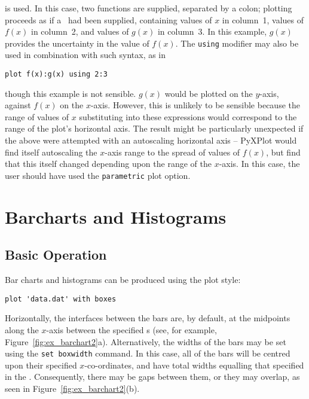 \noindent is used. In this case, two functions are supplied, separated by a
colon; plotting proceeds as if a \datafile\ had been supplied, containing
values of $x$ in column~1, values of $f(x)$ in column~2, and values of $g(x)$
in column~3. In this example, $g(x)$ provides the uncertainty in the value of
$f(x)$.  The {\tt using} modifier may also be used in combination with such
syntax, as in

\begin{verbatim}
plot f(x):g(x) using 2:3
\end{verbatim}

\noindent though this example is not sensible. $g(x)$ would be plotted on the
$y$-axis, against $f(x)$ on the $x$-axis. However, this is unlikely to be
sensible because the range of values of $x$ substituting into these expressions
would correspond to the range of the plot's horizontal axis. The result might
be particularly unexpected if the above were attempted with an autoscaling
horizontal axis -- PyXPlot would find itself autoscaling the $x$-axis range to
the spread of values of $f(x)$, but find that this itself changed depending
upon the range of the $x$-axis. In this case, the user should have used the
{\tt parametric} plot option.

\section{Barcharts and Histograms}
\label{sec:barcharts}

\subsection{Basic Operation}

Bar charts and histograms can be produced using the  plot style:

\begin{verbatim}
plot 'data.dat' with boxes
\end{verbatim}

\noindent Horizontally, the interfaces between the bars are, by default, at the
midpoints along the $x$-axis between the specified \datapoint s (see, for
example, Figure~\ref{fig:ex_barchart2}a).  Alternatively, the widths of the
bars may be set using the {\tt set boxwidth} command. In this case, all of
the bars will be centred upon their specified $x$-co-ordinates, and have total
widths equalling that specified in the . Consequently, there may be
gaps between them, or they may overlap, as seen in
Figure~\ref{fig:ex_barchart2}(b).


